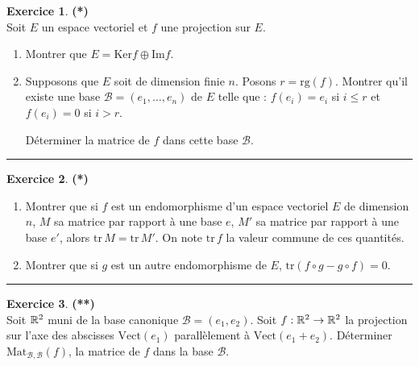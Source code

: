 \documentclass[a4paper,11pt]{article}
\theoremstyle{definition}
\newtheorem{exo}{Exercice} %
\begin{document}
\begin{minipage}{1\linewidth}\begin{minipage}[t]{0.48\linewidth}\raggedright
		
		\begin{exo}\textbf{(*)}\quad\\[0.2cm]
		Soit  $E$  un espace vectoriel et  $f$  une projection sur $E$.
		\begin{enumerate}
			\item Montrer que  $E= \text{Ker} f \oplus \text{Im} f$.
			
			\item Supposons que  $E$ soit de dimension finie  $n$. 
			Posons  $r= \text{rg}(f)$. 
			Montrer qu'il existe une base 
			$\mathcal{B}= ( e_1, \ldots ,e_n)$ de  $E$  telle que : 
			$f(e_i)=e_i$ si $i\le r$ et $f(e_i)=0$ si $i>r$. 
			
			Déterminer la matrice de  $f$ dans cette base $\mathcal{B}$.
		\end{enumerate}	
			
			
			\centering\rule{1\linewidth}{0.6pt}\end{exo}
		
		
		
		\begin{exo}\textbf{(*)}\quad\\[0.2cm]
		
			\begin{enumerate}
				
				\item Montrer que si $f$ est un endomorphisme d'un espace
				vectoriel $E$ de dimension $n$, $M$ sa matrice par rapport à
				une base $e$, $M'$ sa matrice par rapport à une base $e'$,
				alors $\textrm{tr}\, M = \textrm{tr}\, M'$. 
				On note $\textrm{tr}\, f$ la valeur commune de ces quantités.
				
				\item Montrer que si $g$ est un autre endomorphisme de $E$,
				$\textrm{tr}(f\circ g - g\circ f) = 0$.
			\end{enumerate}
			
			\centering\rule{1\linewidth}{0.6pt}\end{exo}
		
		\begin{exo}\textbf{(**)}\quad\\[0.2cm]
		Soit $\mathbb{R}^2$ muni de la base canonique $\mathcal{B}=(e_1, e_2)$.
		Soit $f : \mathbb{R}^2 \to \mathbb{R}^2$ la projection sur l'axe des abscisses $ \text{Vect}(e_1)$  
		parall\`element à $\text{Vect}(e_1+e_2)$.
		Déterminer $\textrm{Mat}_{\mathcal{B},\mathcal{B}}(f)$, la matrice de $f$ dans la base $\mathcal{B}$.
		

\end{exo}
\end{minipage}
\end{minipage}
\end{document}
